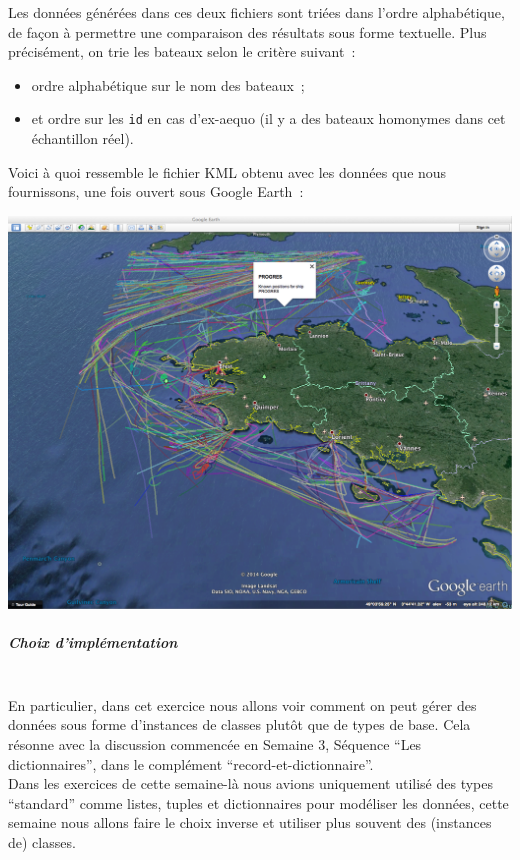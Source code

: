 Les données générées dans ces deux fichiers sont triées dans l'ordre
alphabétique, de façon à permettre une comparaison des résultats sous
forme textuelle. Plus précisément, on trie les bateaux selon le critère
suivant~:

\begin{itemize}
\tightlist
\item
  ordre alphabétique sur le nom des bateaux~;
\item
  et ordre sur les \texttt{id} en cas d'ex-aequo (il y a des bateaux
  homonymes dans cet échantillon réel).
\end{itemize}

    Voici à quoi ressemble le fichier KML obtenu avec les données que nous
fournissons, une fois ouvert sous Google Earth~:

\includegraphics{medias/ships-in-earth.png}

    \hypertarget{choix-dimpluxe9mentation}{%
\subparagraph{Choix d'implémentation\\\\}\label{choix-dimpluxe9mentation}}

    En particulier, dans cet exercice nous allons voir comment on peut gérer
des données sous forme d'instances de classes plutôt que de types de
base. Cela résonne avec la discussion commencée en Semaine 3, Séquence
``Les dictionnaires'', dans le complément ``record-et-dictionnaire''.\\

Dans les exercices de cette semaine-là nous avions uniquement utilisé
des types ``standard'' comme listes, tuples et dictionnaires pour
modéliser les données, cette semaine nous allons faire le choix inverse
et utiliser plus souvent des (instances de) classes.

